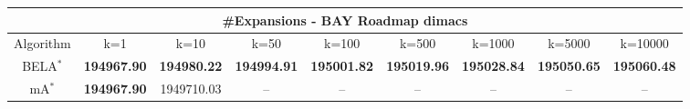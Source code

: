 \begin{tabular}{c|cccccccc}\toprule
\multicolumn{9}{c}{#Expansions - BAY Roadmap dimacs}\\ \midrule
Algorithm & k=1 & k=10 & k=50 & k=100 & k=500 & k=1000 & k=5000 & k=10000 \\ \midrule
BELA$^*$ & \textbf{194967.90} & \textbf{194980.22} & \textbf{194994.91} & \textbf{195001.82} & \textbf{195019.96} & \textbf{195028.84} & \textbf{195050.65} & \textbf{195060.48} \\
mA$^*$ & \textbf{194967.90} & 1949710.03 & -- & -- & -- & -- & -- & -- \\ \bottomrule 
\end{tabular}
